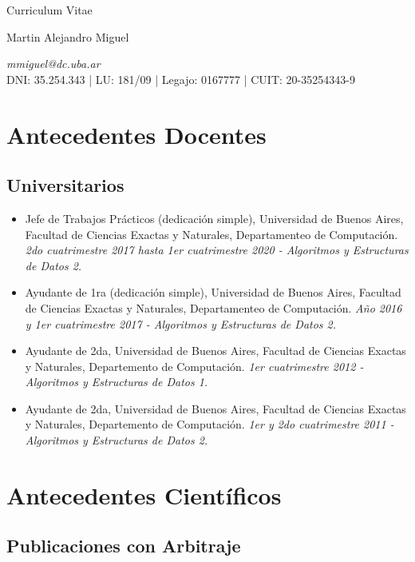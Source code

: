 \documentclass[a4paper,10pt]{article}
\begin{document}
\begin{center}
    { \Huge
    Curriculum Vitae}
\bigskip

{\Large Martin Alejandro Miguel} \\
\medskip

\emph{mmiguel@dc.uba.ar} \\
DNI: 35.254.343 | LU: 181/09 | Legajo: 0167777 | CUIT: 20-35254343-9
\end{center}


\section{Antecedentes Docentes}

\subsection{Universitarios}

\begin{itemize}
    \item Jefe de Trabajos Prácticos (dedicación simple), Universidad de Buenos
        Aires, Facultad de Ciencias Exactas y Naturales, Departamenteo de
        Computación. \emph{2do cuatrimestre 2017 hasta 1er cuatrimestre 2020 -
        Algoritmos y Estructuras de Datos 2.}
    \item Ayudante de 1ra (dedicación simple), Universidad de Buenos Aires,
        Facultad de Ciencias Exactas y Naturales, Departamenteo de Computación.
        \emph{Año 2016 y 1er cuatrimestre 2017 - Algoritmos y Estructuras de
        Datos 2.}
    \item Ayudante de 2da, Universidad de Buenos Aires, Facultad de Ciencias
        Exactas y Naturales, Departemento de Computación. \emph{1er
        cuatrimestre 2012 - Algoritmos y Estructuras de Datos 1.}
    \item Ayudante de 2da, Universidad de Buenos Aires, Facultad de Ciencias
        Exactas y Naturales, Departemento de Computación. \emph{1er y 2do
        cuatrimestre 2011 - Algoritmos y Estructuras de Datos 2.}
\end{itemize}

\section{Antecedentes Científicos}

\subsection{Publicaciones con Arbitraje}
\end{document}
